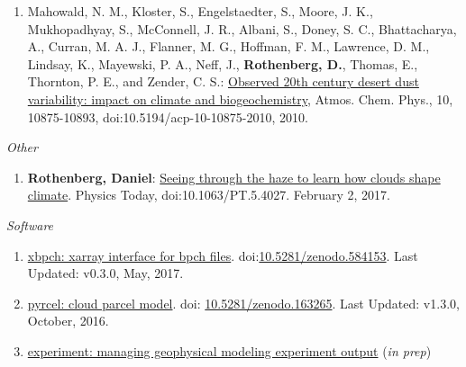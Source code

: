 \documentclass[11pt,letterpaper]{article}
\newcommand{\mhead}[1]{\leavevmode\marginpar{\sffamily\footnotesize #1}}
\begin{document}
\begin{enumerate}[itemindent=-10pt]
 \item Mahowald, N. M., Kloster, S., Engelstaedter, S., Moore, J. K., Mukhopadhyay, S., McConnell, J. R., Albani, S., Doney, S. C., Bhattacharya, A., Curran, M. A. J., Flanner, M. G., Hoffman, F. M., Lawrence, D. M., Lindsay, K., Mayewski, P. A., Neff, J., \textbf{Rothenberg, D.}, Thomas, E., Thornton, P. E., and Zender, C. S.: \href{http://dx.doi.org/10.5194/acp-10-10875-2010}{Observed 20th century desert dust variability: impact on climate and biogeochemistry}, Atmos. Chem. Phys., 10, 10875-10893, doi:10.5194/acp-10-10875-2010, 2010.
\end{enumerate}

\bigskip
\emph{Other}
\medskip
\begin{enumerate}[itemindent=-10pt]

\item \textbf{Rothenberg, Daniel}: \href{http://physicstoday.scitation.org/do/10.1063/PT.5.4027/full/}{Seeing through the haze to learn how clouds shape climate}. Physics Today, doi:10.1063/PT.5.4027. February 2, 2017.

\end{enumerate}

\bigskip
\emph{Software}
\medskip
\begin{enumerate}[itemindent=-10pt]

\item \href{https://github.com/darothen/xbpch}{xbpch: xarray interface for bpch files}. doi:\href{https://doi.org/10.5281/zenodo.584153}{10.5281/zenodo.584153}. Last Updated: v0.3.0, May, 2017.

\item \href{https://github.com/darothen/pyrcel}{pyrcel: cloud parcel model}. doi: \href{https://doi.org/10.5281/zenodo.163265}{10.5281/zenodo.163265}. Last Updated: v1.3.0, October, 2016.

\item \href{https://github.com/darothen/experiment}{experiment: managing geophysical modeling experiment output} (\emph{in prep})

\end{enumerate}


\bigskip
\mhead{Presentations \newline and \newline Talks}%
\end{document}
